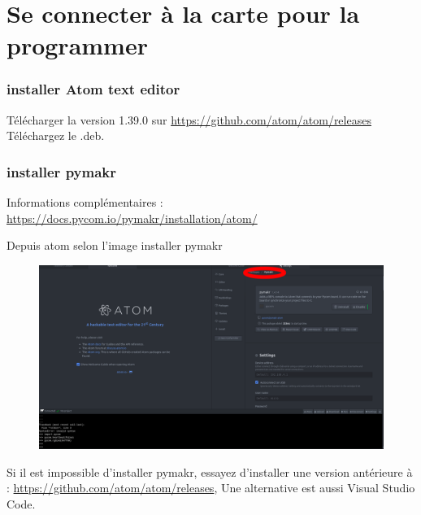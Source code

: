 \documentclass{article}
\begin{document}
\section{Se connecter à la carte pour la programmer}



\subsubsection{installer Atom text editor}


Télécharger la version 1.39.0 sur \url{https://github.com/atom/atom/releases}
Téléchargez le .deb.



\subsubsection{installer pymakr}
Informations complémentaires : \url{https://docs.pycom.io/pymakr/installation/atom/}

Depuis atom selon l'image installer pymakr


    \begin{figure}[H]
\begin{center}
\advance\leftskip-3cm
\advance\rightskip-3cm
\includegraphics[keepaspectratio=true,scale=0.3]{atom.png}
\label{visina8}
\end{center}\end{figure}

Si il est impossible d'installer pymakr, essayez d'installer une version antérieure à : \url{https://github.com/atom/atom/releases},
Une alternative est aussi Visual Studio Code.
\end{document}
